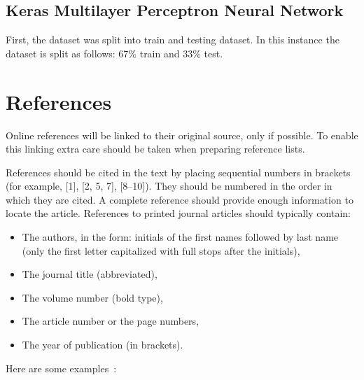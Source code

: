 \documentclass[twocolumn]{webofc}
\begin{document}
\subsection{Keras Multilayer Perceptron Neural Network}\label{sec:data}

First, the dataset was split into train and testing dataset. In this instance the dataset is split as follows: 67\% train and 33\% test. 
\section*{References}
Online references will be linked to their original source, only if possible.
To enable this linking extra care should be taken when preparing reference lists.

References should be cited in the text by placing sequential numbers in brackets (for example, [1], [2, 5, 7], [8--10]).
They should be numbered in the order in which they are cited.
A complete reference should provide enough information to locate the article.
References to printed journal articles should typically contain:
\begin{itemize}
\item The authors, in the form: initials of the first names followed by last name (only the first letter capitalized with full stops after the initials),
\item The journal title (abbreviated), 
\item The volume number (bold type),
\item The article number or the page numbers,
\item The year of publication (in brackets). 
\end{itemize}



Here are some examples~\cite{mecke2004deformability, rabha2012chemical, deluca2009progress, delillo2008sedimentation}:

%
% 

\end{document}
